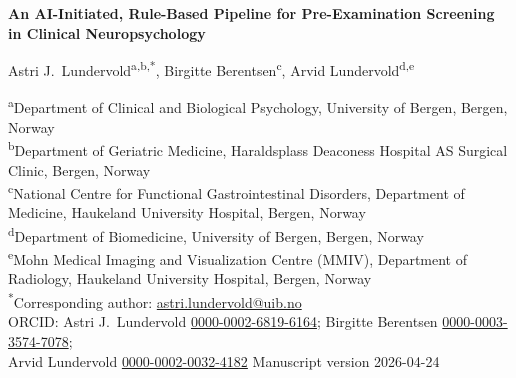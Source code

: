 \documentclass[11pt,a4paper]{article}
\begin{document}
\begin{center}
{\Large\bfseries An AI-Initiated, Rule-Based Pipeline for Pre-Examination Screening in Clinical Neuropsychology}

\bigskip

Astri J.\ Lundervold\textsuperscript{a,b,*},\quad
Birgitte Berentsen\textsuperscript{c},\quad
Arvid Lundervold\textsuperscript{d,e}

\medskip

{\small
\textsuperscript{a}Department of Clinical and Biological Psychology, University of Bergen, Bergen, Norway\\
\textsuperscript{b}Department of Geriatric Medicine, Haraldsplass Deaconess Hospital AS Surgical Clinic, Bergen, Norway\\
\textsuperscript{c}National Centre for Functional Gastrointestinal Disorders, Department of Medicine, Haukeland University Hospital, Bergen, Norway\\
\textsuperscript{d}Department of Biomedicine, University of Bergen, Bergen, Norway\\
\textsuperscript{e}Mohn Medical Imaging and Visualization Centre (MMIV), Department of Radiology, Haukeland University Hospital, Bergen, Norway\\[4pt]
\textsuperscript{*}Corresponding author: \href{mailto:astri.lundervold@uib.no}{astri.lundervold@uib.no}\\[4pt]
ORCID: Astri J.\ Lundervold \href{https://orcid.org/0000-0002-6819-6164}{0000-0002-6819-6164};\quad
Birgitte Berentsen \href{https://orcid.org/0000-0003-3574-7078}{0000-0003-3574-7078};\\
Arvid Lundervold \href{https://orcid.org/0000-0002-0032-4182}{0000-0002-0032-4182} {\tiny Manuscript version 2026-04-24}
}
\end{center}

\bigskip
\end{document}
